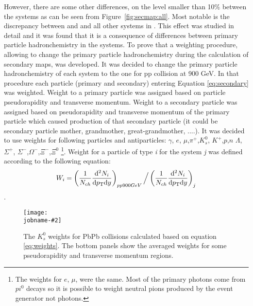 \documentclass[compat,11pt]{alicenote}
\newcommand*{\etaphi}{\ensuremath(\eta,\varphi)}
\newcommand*\SecMap{\ensuremath S_{\subMC,\subIPz,r}\etaphi}
\newcommand{\figref}[1]{Figure~\ref{#1}}
\newcommand\figinput[2][\textwidth]{%
  \texttt{[image: \\jobname-\#2]}}
\begin{document}
However, there are some other differences, on the level smaller than  10\% between the
systems as can be seen from \figref{fig:secmap:all}.  Most notable is
the discrepancy between \PbpCol{} and \PbPbCol{} and all other systems
in . 
This effect was studied in detail and it was found that it is a consequence of differences between
primary particle hadronchemistry in the systems. 
To prove that a weighting procedure, allowing to change the primary particle  hadronchemistry  during 
the calculation of secondary maps, was developed. 
It was decided to change the primary particle hadronchemistry of  each system to the one for pp collision at 900 GeV.
In that procedure each particle (primary and secondary) entering Equation \ref{eq:secondary}  was weighted.
Weight to a primary particle was assigned based on particle pseudorapidity and transverse momentum.
Weight to a secondary particle was assigned based  on pseudorapidity and transverse momentum 
of the primary particle which caused production of that secondary particle (it could be secondary particle mother, grandmother, great-grandmother, ....).
It was decided to use weights for following particles and antiparticles: $\gamma$, $e$, $\mu$,$\pi^{+}$,$K^{0}_{s}$, $K^{+}$,$p$,$n$ $\Lambda$,$\Sigma^{+}$, $\Sigma^{-}$,$\Omega^{-}$,$\Xi^{-}$,$\Xi^{0}$ \footnote{The weights for $e$, $\mu$, were the same. 
Most of the primary photons come from $pi^{0}$ decays so it is possible to weight neutral pions produced by the event generator not photons.}.
Weight for a particle of type \textit{i} for the system \textit{j} was defined according to the following equation: 
\begin{align}
  \label{eq:weights}
  W_{i}= \left( {\frac{1}{N_{ch}}\frac{{\rm d}^{2}N_{i}}{{\rm d} p_{\rm{T}} {\rm d} y}} \right)_{pp900GeV} \Big/ \left( {\frac{1}{N_{ch}}\frac{{\rm d}^{2}N_{i}}{{\rm d} p_{\rm{T}} {\rm d} y}}\right)_{j}
\end{align}.
\begin{figure}[]
  \centering
  \figinput[.7\textwidth]{310weights}
  \caption{The $K^{0}_{s}$  weights for PbPb collisions calculated based on equation \ref{eq:weights}. 
The bottom panels show the averaged weights for some pseudorapidity and transverse momentum regions.}
  \label{fig:weights}
\end{figure} 

\end{document}
